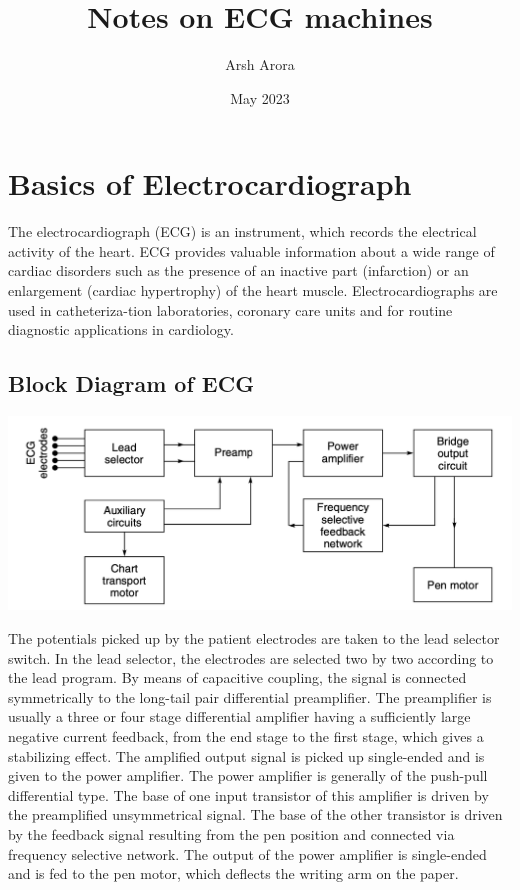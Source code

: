 \documentclass{article}
\title{Notes on ECG machines}
\author{Arsh Arora}
\date{May 2023}
\begin{document}
\maketitle

\section{Basics of Electrocardiograph}
The electrocardiograph (ECG) is an instrument, which records the electrical activity of the heart. ECG provides valuable information about a wide range of cardiac disorders such as the presence of an inactive part (infarction) or an enlargement (cardiac hypertrophy) of the heart muscle. Electrocardiographs are used in catheteriza-tion laboratories, coronary care units and for routine diagnostic applications in cardiology.
\subsection{Block Diagram of ECG}
\begin{center}
    \includegraphics[scale=0.4]{Screenshot 2023-05-02 at 7.00.42 PM.png}
\end{center}
The potentials picked up by the patient electrodes are taken to the lead selector switch. In the lead selector, the electrodes are selected two by two according to the lead program. By means of capacitive coupling, the signal is connected symmetrically to the long-tail pair differential preamplifier. The preamplifier is usually a three or four stage differential amplifier having a sufficiently large negative current feedback, from the end stage to the first stage, which gives a stabilizing effect. The amplified output signal is picked up single-ended and is given to the power amplifier. The power amplifier is generally of the push-pull differential type. The base of one input transistor of this amplifier is driven by the preamplified unsymmetrical signal. The base of the other transistor is driven by the feedback signal resulting from the pen position and connected via frequency selective network. The output of the power amplifier is single-ended and is fed to the pen motor, which deflects the writing arm on the paper.\\
\end{document}

